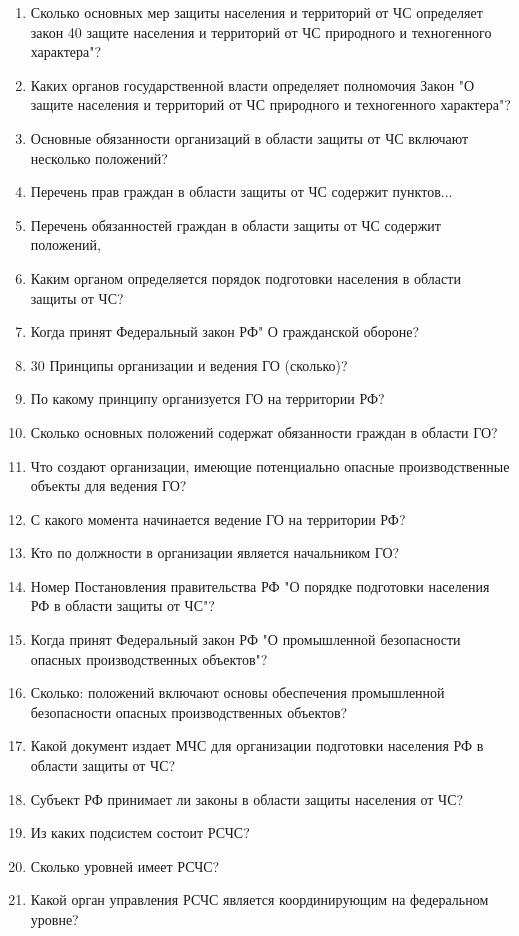 \documentclass[oneside,final,14pt]{extreport}
\begin{document}
\begin{enumerate}
	\item  Сколько основных мер защиты населения и территорий от ЧС определяет закон 40 защите населения и территорий от ЧС природного и техногенного характера"?
	\item  Каких органов государственной власти определяет полномочия Закон "О
	защите населения и территорий от ЧС природного и техногенного характера"?
	\item  Основные обязанности организаций в области защиты от ЧС включают несколько положений?
	\item  Перечень прав граждан в области защиты от ЧС содержит пунктов...
	\item  Перечень обязанностей граждан в области защиты от ЧС содержит положений,
	\item  Каким органом определяется порядок подготовки населения в области защиты от ЧС?
	\item  Когда принят Федеральный закон РФ" О гражданской обороне?
	\item 30 Принципы организации и ведения ГО (сколько)?
	\item  По какому принципу организуется ГО на территории РФ?
	\item  Сколько основных положений содержат обязанности граждан в области ГО?
	\item  Что создают организации, имеющие потенциально опасные производственные объекты для ведения ГО?
	\item  С какого момента начинается ведение ГО на территории РФ?
	\item  Кто по должности в организации является начальником ГО?
	\item  Номер Постановления правительства РФ "О порядке подготовки населения РФ в области защиты от ЧС"?
	\item  Когда принят Федеральный закон РФ "О промышленной безопасности опасных производственных объектов"?
	\item  Сколько: положений включают основы обеспечения промышленной безопасности опасных производственных объектов?
	\item  Какой документ издает МЧС для организации подготовки населения РФ в области защиты от ЧС?
	\item Субъект РФ принимает ли законы в области защиты населения от ЧС?
	\item  Из каких подсистем состоит РСЧС?
	\item  Сколько уровней имеет РСЧС?
	\item  Какой орган управления РСЧС является координирующим на федеральном уровне?

\end{enumerate}
\end{document}
